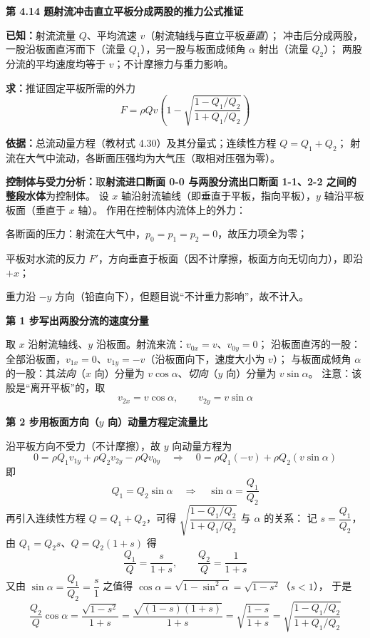 \noindent\textbf{第 4.14 题\quad 射流冲击直立平板分成两股的推力公式推证}

\begin{jie}
\textbf{已知：}射流流量 $Q$、平均流速 $v$（射流轴线与直立平板\emph{垂直}）；
冲击后分成两股，一股沿板面直泻而下（流量 $Q_1$），另一股与板面成倾角 $\alpha$ 射出（流量 $Q_2$）；
两股分流的平均速度均等于 $v$；不计摩擦力与重力影响。

\textbf{求：}推证固定平板所需的外力
\[ F=\rho Qv\left(1-\sqrt{\frac{1-Q_1/Q_2}{1+Q_1/Q_2}}\right) \]

\textbf{依据：}总流动量方程（教材式 4.30）及其分量式；连续性方程 $Q=Q_1+Q_2$；
射流在大气中流动，各断面压强均为大气压（取相对压强为零）。

\textbf{控制体与受力分析：}取\textbf{射流进口断面 0-0 与两股分流出口断面 1-1、2-2 之间的整段水体}为控制体。
设 $x$ 轴沿射流轴线（即垂直于平板，指向平板），$y$ 轴沿平板板面（垂直于 $x$ 轴）。
作用在控制体内流体上的外力：
\begin{xiaowen}
\item 各断面的压力：射流在大气中，$p_0=p_1=p_2=0$，故压力项全为零；
\item 平板对水流的反力 $F'$，方向垂直于板面（因不计摩擦，板面方向无切向力），即沿 $+x$；
\item 重力沿 $-y$ 方向（铅直向下），但题目说“不计重力影响”，故不计入。
\end{xiaowen}

\textbf{第 1 步\quad 写出两股分流的速度分量}

取 $x$ 沿射流轴线、$y$ 沿板面。射流来流：$v_{0x}=v$、$v_{0y}=0$；
沿板面直泻的一股：全部沿板面，$v_{1x}=0$、$v_{1y}=-v$（沿板面向下，速度大小为 $v$）；
与板面成倾角 $\alpha$ 的一股：其\emph{法向}（$x$ 向）分量为 $v\cos\alpha$、\emph{切向}（$y$ 向）分量为 $v\sin\alpha$。
注意：该股是“离开平板”的，取
\[ v_{2x}=v\cos\alpha,\qquad v_{2y}=v\sin\alpha \]

\textbf{第 2 步\quad 用板面方向（$y$ 向）动量方程定流量比}

沿平板方向不受力（不计摩擦），故 $y$ 向动量方程为
\[ 0=\rho Q_1v_{1y}+\rho Q_2v_{2y}-\rho Qv_{0y}
   \quad\Longrightarrow\quad 0=\rho Q_1(-v)+\rho Q_2(v\sin\alpha) \]
即
\[ Q_1=Q_2\sin\alpha\quad\Longrightarrow\quad \sin\alpha=\frac{Q_1}{Q_2} \]
再引入连续性方程 $Q=Q_1+Q_2$，可得 $\sqrt{\dfrac{1-Q_1/Q_2}{1+Q_1/Q_2}}$ 与 $\alpha$ 的关系：
记 $s=\dfrac{Q_1}{Q_2}$，由 $Q_1=Q_2s$、$Q=Q_2(1+s)$ 得
\[ \frac{Q_1}{Q}=\frac{s}{1+s},\qquad \frac{Q_2}{Q}=\frac{1}{1+s} \]
又由 $\sin\alpha=\dfrac{Q_1}{Q_2}=\dfrac{s}{1}$ 之值得 $\cos\alpha=\sqrt{1-\sin^2\alpha}=\sqrt{1-s^2}$（$s<1$），
于是
\[ \frac{Q_2}{Q}\cos\alpha=\frac{\sqrt{1-s^2}}{1+s}=\frac{\sqrt{(1-s)(1+s)}}{1+s}
   =\sqrt{\frac{1-s}{1+s}}=\sqrt{\frac{1-Q_1/Q_2}{1+Q_1/Q_2}} \]


\end{jie}
